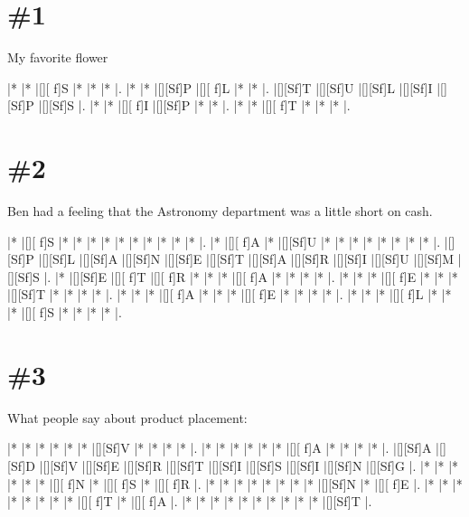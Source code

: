 \documentclass[letterpaper]{article}
\begin{document}
\newpage
\section*{\#1}
My favorite flower

\vspace*{1em}
\begin{Puzzle}{6}{5}
|*        |*        |[][ f]S  |*        |*        |*        |.
|*        |*        |[][Sf]P  |[][ f]L  |*        |*        |.  
|[][Sf]T  |[][Sf]U  |[][Sf]L  |[][Sf]I  |[][Sf]P  |[][Sf]S  |.
|*        |*        |[][ f]I  |[][Sf]P  |*        |*        |. 
|*        |*        |[][ f]T  |*        |*        |*        |. 
\end{Puzzle}

\section*{\#2}
Ben had a feeling that the Astronomy department was a little short on cash.
\vspace*{1em}
\begin{Puzzle}{12}{8}
|*        |[][ f]S  |*        |*        |*        |*        |*        |*        |*        |*        |*        |*        |.
|*        |[][ f]A  |*        |[][Sf]U  |*        |*        |*        |*        |*        |*        |*        |*        |.
|[][Sf]P  |[][Sf]L  |[][Sf]A  |[][Sf]N  |[][Sf]E  |[][Sf]T  |[][Sf]A  |[][Sf]R  |[][Sf]I  |[][Sf]U  |[][Sf]M  |[][Sf]S  |.
|*        |[][Sf]E  |[][ f]T  |[][ f]R  |*        |*        |*        |[][ f]A  |*        |*        |*        |*        |.
|*        |*        |*        |[][ f]E  |*        |*        |*        |[][Sf]T  |*        |*        |*        |*        |.
|*        |*        |*        |[][ f]A  |*        |*        |*        |[][ f]E  |*        |*        |*        |*        |.
|*        |*        |*        |[][ f]L  |*        |*        |*        |[][ f]S  |*        |*        |*        |*        |.
\end{Puzzle}

\section*{\#3}
What people say about product placement:
\vspace*{1em}
\begin{Puzzle}{11}{7}
|*        |*        |*        |*        |*        |*        |[][Sf]V  |*        |*        |*        |*        |.
|*        |*        |*        |*        |*        |*        |[][ f]A  |*        |*        |*        |*        |.  
|[][Sf]A  |[][Sf]D  |[][Sf]V  |[][Sf]E  |[][Sf]R  |[][Sf]T  |[][Sf]I  |[][Sf]S  |[][Sf]I  |[][Sf]N  |[][Sf]G  |.
|*        |*        |*        |*        |*        |*        |[][ f]N  |*        |[][ f]S  |*        |[][ f]R  |. 
|*        |*        |*        |*        |*        |*        |*        |*        |[][Sf]N  |*        |[][ f]E  |.
|*        |*        |*        |*        |*        |*        |*        |*        |[][ f]T  |*        |[][ f]A  |.
|*        |*        |*        |*        |*        |*        |*        |*        |*        |*        |[][Sf]T  |.
\end{Puzzle}
\end{document}
